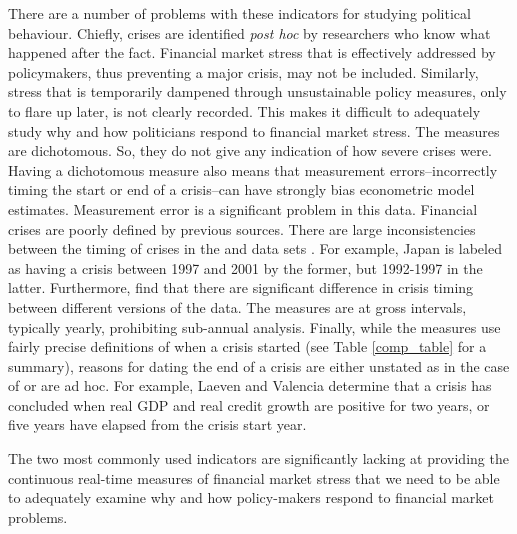 \documentclass[]{article}
\begin{document}
There are a number of problems with these indicators for studying political behaviour. Chiefly, crises are identified \emph{post hoc} by researchers who know what happened after the fact. Financial market stress that is effectively addressed by policymakers, thus preventing a major crisis, may not be included. Similarly, stress that is temporarily dampened through unsustainable policy measures, only to flare up later, is not clearly recorded. This makes it difficult to adequately study why and how politicians respond to financial market stress. The measures are dichotomous. So, they do not give any indication of how severe crises were. Having a dichotomous measure also means that measurement errors--incorrectly timing the start or end of a crisis--can have strongly bias econometric model estimates. Measurement error is a significant problem in this data. Financial crises are poorly defined by previous sources. There are large inconsistencies between the timing of crises in the \cite{laeven2013} and \cite{Reinhart2009} data sets \citep{Chaudron2014}. For example, Japan is labeled as having a crisis between 1997 and 2001 by the former, but 1992-1997 in the latter. Furthermore, \cite{GandrudHallerberg2015} find that there are significant difference in crisis timing between different versions of the \cite{laeven2013} data. The measures are at gross intervals, typically yearly, prohibiting sub-annual analysis. Finally, while the measures use fairly precise definitions of when a crisis started (see Table \ref{comp_table} for a summary), reasons for dating the end of a crisis are either unstated as in the case of \cite{Reinhart2009} or are ad hoc. For example, Laeven and Valencia \citeyearpar[footnote 19]{laeven2013} determine that a crisis has concluded when real GDP and real credit growth are positive for two years, or five years have elapsed from the crisis start year.

The two most commonly used indicators are significantly lacking at providing the continuous real-time measures of financial market stress that we need to be able to adequately examine why and how policy-makers respond to financial market problems.
\end{document}
